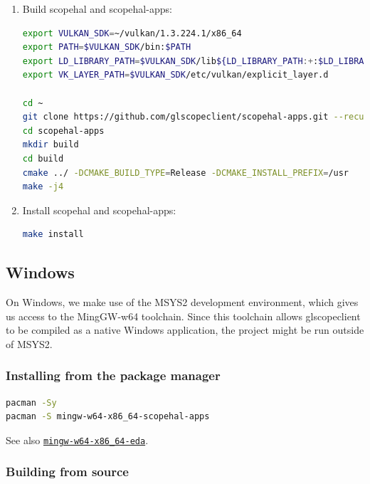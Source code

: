 \begin{enumerate}
\item Build scopehal and scopehal-apps:

\begin{lstlisting}[language=sh, numbers=none]
export VULKAN_SDK=~/vulkan/1.3.224.1/x86_64
export PATH=$VULKAN_SDK/bin:$PATH
export LD_LIBRARY_PATH=$VULKAN_SDK/lib${LD_LIBRARY_PATH:+:$LD_LIBRARY_PATH}
export VK_LAYER_PATH=$VULKAN_SDK/etc/vulkan/explicit_layer.d

cd ~
git clone https://github.com/glscopeclient/scopehal-apps.git --recurse-submodules
cd scopehal-apps
mkdir build
cd build
cmake ../ -DCMAKE_BUILD_TYPE=Release -DCMAKE_INSTALL_PREFIX=/usr
make -j4
\end{lstlisting}

\item Install scopehal and scopehal-apps:

\begin{lstlisting}[language=sh, numbers=none]
make install
\end{lstlisting}

\end{enumerate}

\subsection{Windows}

On Windows, we make use of the MSYS2 development environment, which gives us access to the MingGW-w64 toolchain.
Since this toolchain allows glscopeclient to be compiled as a native Windows application, the project might be run
outside of MSYS2.

\subsubsection{Installing from the package manager}

\begin{lstlisting}[language=sh, numbers=none]
pacman -Sy
pacman -S mingw-w64-x86_64-scopehal-apps
\end{lstlisting}

See also \href{https://packages.msys2.org/group/mingw-w64-x86_64-eda}{\lstinline{mingw-w64-x86_64-eda}}.

\subsubsection{Building from source}

